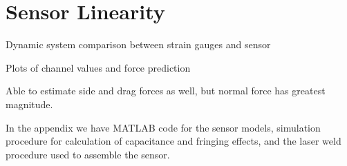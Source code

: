 \chapter{Sensor Linearity
\label{chap:10}}

Dynamic system comparison between strain gauges and sensor

Plots of channel values and force prediction

Able to estimate side and drag forces as well, but normal force has greatest magnitude.

In the appendix we have MATLAB code for the sensor models,
simulation procedure for calculation of capacitance and fringing effects,
and the laser weld procedure used to assemble the sensor.

